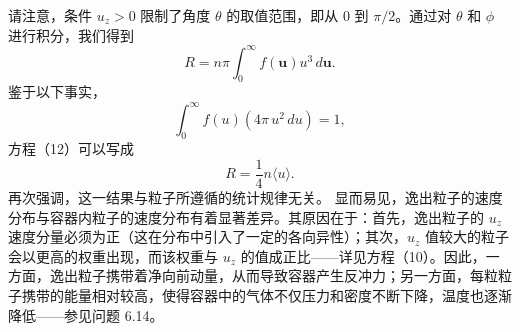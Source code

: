 请注意，条件 \(u_{z} > 0\) 限制了角度 \(\theta\) 的取值范围，即从 0 到 \(\pi/2\)。通过对 \(\theta\) 和 \(\phi\) 进行积分，我们得到
\begin{equation}\tag{6.4.11}\label{eq:6.4.11}
R = n \pi \int _ { 0 } ^{\infty} f ( \mathbf { u } ) u ^{3} \, d \mathbf { u } .
\end{equation}
鉴于以下事实，
\begin{equation}\tag{6.4.12}\label{eq:6.4.12}
\int _ { 0 } ^{\infty} f ( u ) ( 4 \pi \, u ^{2} \, d u ) = 1 ,
\end{equation}
方程（12）可以写成
\begin{equation}\tag{6.4.13}\label{eq:6.4.13}
R = \frac { 1 } { 4 } n \langle u \rangle .
\end{equation}
再次强调，这一结果与粒子所遵循的统计规律无关。
显而易见，逸出粒子的速度分布与容器内粒子的速度分布有着显著差异。其原因在于：首先，逸出粒子的 \(u_{z}\) 速度分量必须为正（这在分布中引入了一定的各向异性）；其次，\(u_{z}\) 值较大的粒子会以更高的权重出现，而该权重与 \(u_{z}\) 的值成正比——详见方程（10）。因此，一方面，逸出粒子携带着净向前动量，从而导致容器产生反冲力；另一方面，每粒粒子携带的能量相对较高，使得容器中的气体不仅压力和密度不断下降，温度也逐渐降低——参见问题 6.14。
